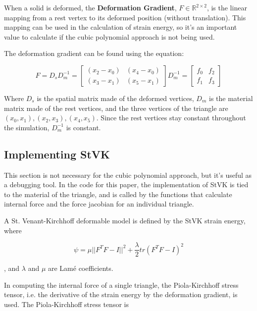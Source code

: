 \documentclass[twocolumn,10pt]{asme2ej}
\begin{document}
When a solid is deformed, the \textbf{Deformation Gradient}, $F \in \mathbb{R}^{2 \times 2}$, is the linear mapping from a rest vertex to its deformed position (without translation). This mapping can be used in the calculation of strain energy, so it's an important value to calculate if the cubic polynomial approach is not being used.

The deformation gradient can be found using the equation:

\begin{equation}
F = D_sD_{m}^{-1} = \begin{bmatrix} (x_2 - x_0) & (x_4 - x_0) \\ (x_3 - x_1) & (x_5 - x_1) \end{bmatrix} D_{m}^{-1} = \begin{bmatrix} f_0 & f_2 \\ f_1 & f_3 \end{bmatrix}
\label{eq_F}
\end{equation}

Where $D_s$ is the spatial matrix made of the deformed vertices, $D_m$ is the material matrix made of the rest vertices, and the three vertices of the triangle are $(x_0, x_1), (x_2, x_3), (x_4, x_5)$. Since the rest vertices stay constant throughout the simulation, $D_{m}^{-1}$ is constant.

\subsection{Implementing StVK}

This section is not necessary for the cubic polynomial approach, but it's useful as a debugging tool. In the code
for this paper, the implementation of StVK is tied to the material of the triangle, and is called by the functions
that calculate internal force and the force jacobian for an individual triangle.

A St. Venant-Kirchhoff deformable model is defined by the StVK strain energy, where

\begin{equation}
\psi = \mu ||F^TF - I||^2 + \frac{\lambda}{2}tr(F^TF - I)^2
\label{eq_stvk}
\end{equation}

, and $\lambda$ and $\mu$ are Lamé coefficients.

In computing the internal force of a single triangle, the Piola-Kirchhoff stress tensor, i.e. the derivative of the strain energy by the deformation gradient, is used. The Piola-Kirchhoff stress tensor is
\end{document}
